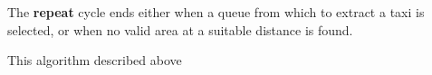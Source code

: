 The \textbf{repeat} cycle ends either when a queue from which to extract a taxi is selected, or when no valid area at a suitable distance is found.

This algorithm described above 





















